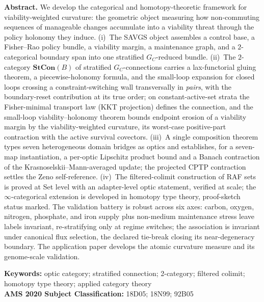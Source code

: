 \documentclass[11pt,a4paper]{article}
\theoremstyle{plain}
\theoremstyle{definition}
\theoremstyle{remark}
\begin{document}
\vspace{0.6em}
\begin{center}
\begin{minipage}{0.92\textwidth}
\small
\textbf{Abstract.} We develop the categorical and
homotopy-theoretic framework for viability-weighted curvature: the
geometric object measuring how non-commuting sequences of
manageable changes accumulate into a viability threat
through the policy holonomy they induce.
(i)~The SAVGS object assembles a control base, a Fisher--Rao
policy bundle, a viability margin, a maintenance graph, and a
$2$-categorical boundary span into one stratified $G_C$-reduced
bundle. (ii)~The $2$-category $\mathbf{StCon}(B)$ of stratified
$G_C$-connections carries a lax-functorial gluing theorem, a
piecewise-holonomy formula, and the small-loop expansion for closed
loops crossing a constraint-switching wall transversally in
\emph{pairs}, with the boundary-reset contribution at its true
order; on constant-active-set strata the Fisher-minimal transport
law (KKT projection) defines the connection, and the small-loop
viability--holonomy theorem bounds endpoint erosion of a viability
margin by the viability-weighted curvature, its worst-case
positive-part contraction with the active survival covectors.
(iii)~A single composition theorem types seven heterogeneous
domain bridges as optics and establishes, for a
seven-map instantiation, a per-optic Lipschitz product bound and a
Banach contraction of the Krasnoselskii--Mann-averaged update; the
projected CPTP contraction settles the Zeno self-reference.
(iv)~The filtered-colimit construction of RAF sets is proved at Set
level with an adapter-level optic statement, verified at scale;
the $\infty$-categorical extension is developed in homotopy type
theory, proof-sketch status marked. The validation battery is
robust across six axes: carbon, oxygen, nitrogen,
phosphate, and iron supply plus non-medium maintenance stress
leave labels invariant, re-stratifying only at
regime switches; the association is invariant under canonical
flux selection, the declared tie-break closing its near-degeneracy
boundary. The application paper
develops the atomic curvature measure and its genome-scale
validation.
\par
\vspace{0.5em}

\noindent\textbf{Keywords:} optic category; stratified connection;
2-category; filtered colimit; homotopy type theory;
applied category theory\\[0.3em]
\noindent\textbf{AMS 2020 Subject Classification:} 18D05; 18N99;
92B05\par
\end{minipage}
\end{center}
\end{document}
